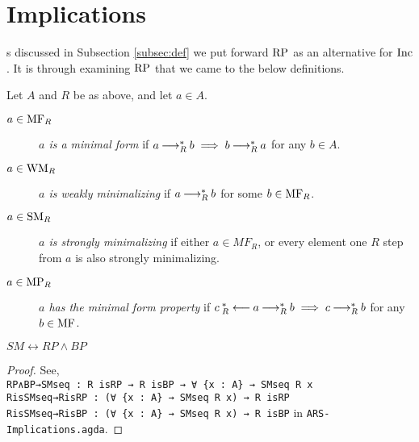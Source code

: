 \section{Implications}
\label{sec:Implications}

\newenvironment{counterexample}[1][]{%
    \refstepcounter{CEcounter} %
    \noindent \scriptsize\textbf{{\theCEcounter } }  #1\par
}

As discussed in Subsection \ref{subsec:def} we put forward $\mathrm{RP}$ as an alternative for $\mathrm{Inc}$. It is through examining $\mathrm{RP}$ that 
we came to the below definitions. 

\begin{definition}\label{def:mf}  Let $A$ and $R$ be as above, and let $a \in A$.
    \begin{description}
        \item[$a \in \mathrm{MF}_R$] \emph{$a$ is a minimal form} if $a \mathbin{\longrightarrow_R^*} b \implies b \mathbin{\longrightarrow_R^*} a$ for any $b \in A$.
        \item[$a \in \mathrm{WM}_R$] \emph{$a$ is weakly minimalizing} if $a \mathbin{\longrightarrow_R^*} b$ for some $b \in \mathrm{MF}_R$.
        \item[$a \in \mathrm{SM}_R$]  \emph{$a$ is strongly minimalizing} if either $a \in MF_R$, or every element one $R$ step from $a$ is also strongly minimalizing.
        \item[$a \in \mathrm{MP}_R$] \emph{$a$ has the minimal form property} if $c \mathbin{_R^*\longleftarrow} a \mathbin{\longrightarrow_R^*} b \implies c \mathbin{\longrightarrow_R^*} b$ for any $b \in \mathrm{MF}$.

    \end{description}
\end{definition}

\begin{proposition}\label{prop:SMRP}
    $SM \leftrightarrow RP \land BP$
\end{proposition}
\begin{proof}
    See,\\ \verb|RP∧BP→SMseq : R isRP → R isBP → ∀ {x : A} → SMseq R x| \\ \verb|RisSMseq→RisRP : (∀ {x : A} → SMseq R x) → R isRP|
    \\ \verb|RisSMseq→RisBP : (∀ {x : A} → SMseq R x) → R isBP| in \texttt{ARS-Implications.agda}.
\end{proof}

